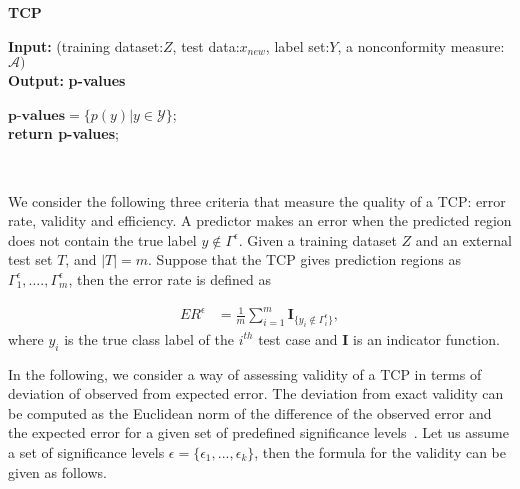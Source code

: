 \documentclass[main]{subfiles}
\begin{document}
\vspace{0.3cm}
\begin{algorithm}[H]
 \caption{\textbf{TCP}} \label{algo:TCP}
 \textbf{Input:}{ (training dataset:$Z$, test data:$x_{new}$, label set:$Y$, a nonconformity measure:$\mathcal{A})$}\\
 \textbf{Output:}{\textbf{ p-values} }\\

 $\textbf{p-values} = \{ p(y)| y \in \mathcal{Y}\}$;\\
 \textbf{return \textbf{p-values}};\\
 \end{algorithm}
 \vspace{10pt}
\textbf{ \\}

 
We consider the following three criteria that measure the quality of a TCP: error rate,
validity and efficiency. A predictor makes an error when the predicted region does not contain the true label $ y \not\in \Gamma^{\epsilon}$. Given a training dataset $Z$ and an external test set $T$,  and $|T| = m$. Suppose that the TCP gives prediction regions as $\Gamma_1^{\epsilon}, ...., \Gamma_m^{\epsilon}$, then the error rate is defined as 

\begin{definition}
\begin{align} \label{eq:errorRate}
		ER^{\epsilon} &= \frac{ 1}{m} \sum\limits_{i=1}^{m} \textbf{I}_{ \{y_i \not\in \Gamma_i^{\epsilon} \} },		
\end{align}	
where $y_i$ is the true class label of the $i^{th}$ test case and $\textbf{I}$ is an indicator function. 	
\end{definition}
In the following, we consider a way of assessing validity of a TCP in terms of deviation of observed from expected error. The deviation from exact validity can be computed as the Euclidean norm of the difference of the observed error and the expected error for a given set of predefined significance levels~\citep{carlsson2017comparing}. Let us assume a set of significance levels $\epsilon = \{ \epsilon_1, ..., \epsilon_k \}$, then the formula for the validity can be given as follows.
\end{document}
